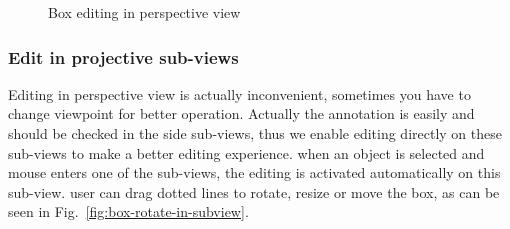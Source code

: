 \documentclass[letterpaper, 10 pt, conference]{ieeeconf}  %
\begin{document}
\begin{figure}[t]
	\centering
	\caption{Box editing in perspective view}
	\label{fig:box-mouse-edit}
\end{figure}

\subsubsection{Edit in projective sub-views}
Editing in perspective view is actually inconvenient, sometimes you have to change viewpoint for better operation. Actually the annotation is easily and should be checked in the side sub-views, thus we enable editing directly on these sub-views to make a better editing experience. when an object is selected and mouse enters one of the sub-views, the editing is activated automatically on this sub-view. user can drag dotted lines to rotate, resize or move the box, as can be seen in Fig.~\ref{fig:box-rotate-in-subview}.
\end{document}
